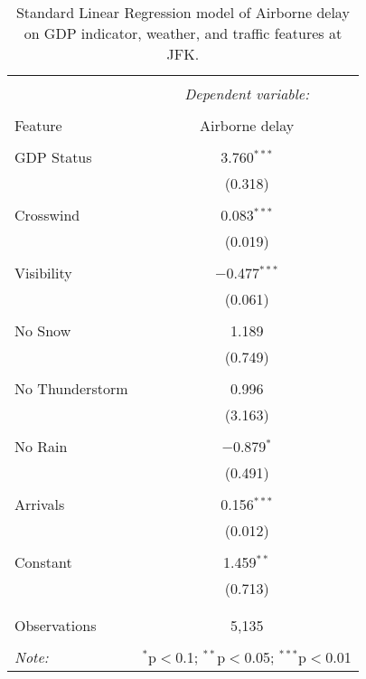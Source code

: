 \documentclass[11pt]{scrartcl}
\begin{document}
\begin{table}[!htbp] \centering 
  \caption{Standard Linear Regression model of Airborne delay on GDP indicator, weather, and traffic features at JFK.} 
  \label{} 
\begin{tabular}{@{\extracolsep{5pt}}lc} 
\\[-1.8ex]\hline 
\hline \\[-1.8ex] 
 & \multicolumn{1}{c}{\textit{Dependent variable:}} \\ 
\cline{2-2} 
\\[-1.8ex] Feature & Airborne delay \\ 
\hline \\[-1.8ex] 
 GDP Status & 3.760$^{***}$ \\ 
  & (0.318) \\ 
  & \\ 
 Crosswind & 0.083$^{***}$ \\ 
  & (0.019) \\ 
  & \\ 
 Visibility & $-$0.477$^{***}$ \\ 
  & (0.061) \\ 
  & \\ 
 No Snow & 1.189 \\ 
  & (0.749) \\ 
  & \\ 
 No Thunderstorm & 0.996 \\ 
  & (3.163) \\ 
  & \\ 
 No Rain & $-$0.879$^{*}$ \\ 
  & (0.491) \\ 
  & \\ 
 Arrivals & 0.156$^{***}$ \\ 
  & (0.012) \\ 
  & \\ 
 Constant & 1.459$^{**}$ \\ 
  & (0.713) \\ 
  & \\ 
\hline \\[-1.8ex] 
Observations & 5,135 \\ 
\hline 
\hline \\[-1.8ex] 
\textit{Note:}  & \multicolumn{1}{r}{$^{*}$p$<$0.1; $^{**}$p$<$0.05; $^{***}$p$<$0.01} \\ 
\end{tabular} 
\end{table} 
\end{document}
